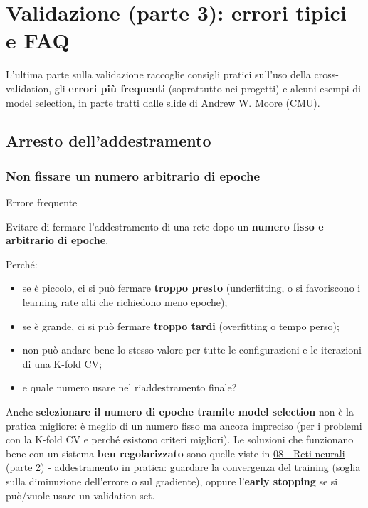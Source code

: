\chapter{Validazione (parte 3): errori tipici e FAQ}\label{ch-11}

L'ultima parte sulla validazione raccoglie consigli pratici sull'uso
della cross-validation, gli \textbf{errori più frequenti} (soprattutto
nei progetti) e alcuni esempi di model selection, in parte tratti dalle
slide di Andrew W. Moore (CMU).

\section{Arresto dell'addestramento}\label{arresto-delladdestramento}

\subsection{Non fissare un numero arbitrario di
epoche}\label{non-fissare-un-numero-arbitrario-di-epoche}

\begin{boxwarning}{Errore frequente}

Evitare di fermare l'addestramento di una rete dopo un \textbf{numero
fisso e arbitrario di epoche}.

\end{boxwarning}

Perché:

\begin{itemize}
\tightlist
\item
  se è piccolo, ci si può fermare \textbf{troppo presto} (underfitting,
  o si favoriscono i learning rate alti che richiedono meno epoche);
\item
  se è grande, ci si può fermare \textbf{troppo tardi} (overfitting o
  tempo perso);
\item
  non può andare bene lo stesso valore per tutte le configurazioni e le
  iterazioni di una K-fold CV;
\item
  e quale numero usare nel riaddestramento finale?
\end{itemize}

Anche \textbf{selezionare il numero di epoche tramite model selection}
non è la pratica migliore: è meglio di un numero fisso ma ancora
impreciso (per i problemi con la K-fold CV e perché esistono criteri
migliori). Le soluzioni che funzionano bene con un sistema \textbf{ben
regolarizzato} sono quelle viste in
\href{08\%20-\%20Reti\%20neurali\%20(parte\%202)\%20-\%20addestramento\%20in\%20pratica}{08
- Reti neurali (parte 2) - addestramento in pratica}: guardare la
convergenza del training (soglia sulla diminuzione dell'errore o sul
gradiente), oppure l'\textbf{early stopping} se si può/vuole usare un
validation set.

